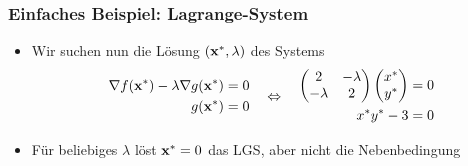 \begin{frame}
  \frametitle<presentation>{Einfaches Beispiel: Lagrange-System}
  \begin{itemize}
  \item Wir suchen nun die Lösung $(\mathbf{x}^*,\lambda)$ des Systems
    \begin{gather*}
      \begin{aligned}
        \nabla f(\mathbf{x}^*) - \lambda \nabla g(\mathbf{x}^*) &= 0\\
        g(\mathbf{x}^*) &=0
      \end{aligned}
      \quad\Leftrightarrow\quad
      \begin{aligned}
      \begin{pmatrix}
        2 & -\lambda\\-\lambda & 2
      \end{pmatrix}
        \begin{pmatrix}
          x^*\\y^*
        \end{pmatrix}
        &= 0\\
          x^*y^*-3 &= 0
      \end{aligned}
    \end{gather*}
  \item Für beliebiges $\lambda$ löst $\mathbf{x}^*=0$ das LGS, aber nicht die Nebenbedingung
  \end{itemize}
\end{frame}

